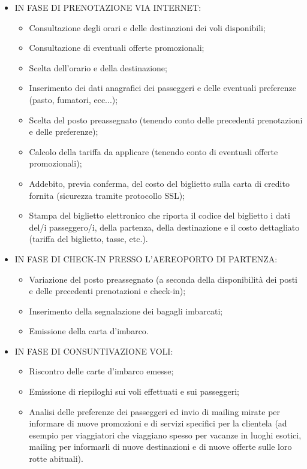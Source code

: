 \begin{itemize}

\item{IN FASE DI PRENOTAZIONE VIA INTERNET}:

\begin{itemize}

\item Consultazione degli orari e delle destinazioni dei voli disponibili;
\item Consultazione di eventuali offerte promozionali;
\item Scelta dell’orario e della destinazione;
\item Inserimento dei dati anagrafici dei passeggeri e delle eventuali preferenze (pasto, fumatori, ecc...);
\item Scelta del posto preassegnato (tenendo conto delle precedenti prenotazioni e delle preferenze);
\item Calcolo della tariffa da applicare (tenendo conto di eventuali offerte promozionali);
\item Addebito, previa conferma, del costo del biglietto sulla carta di credito fornita (sicurezza tramite protocollo SSL);
\item Stampa del biglietto elettronico che riporta il codice del biglietto i dati del/i passeggero/i, della partenza, della destinazione e il costo dettagliato (tariffa del biglietto, tasse, etc.).

\end{itemize}

\item{IN FASE DI CHECK-IN PRESSO L’AEREOPORTO DI PARTENZA}:

\begin{itemize}

\item Variazione del posto preassegnato (a seconda della disponibilità dei posti e delle precedenti prenotazioni e check-in);
\item Inserimento della segnalazione dei bagagli imbarcati;
\item Emissione della carta d’imbarco.

\end{itemize}

\item{IN FASE DI CONSUNTIVAZIONE VOLI}:

\begin{itemize}

\item Riscontro delle carte d’imbarco emesse;
\item Emissione di riepiloghi sui voli effettuati e sui passeggeri;
\item Analisi delle preferenze dei passeggeri ed invio di mailing mirate per informare di nuove promozioni e di servizi specifici per la clientela (ad esempio per viaggiatori che viaggiano spesso per vacanze in luoghi esotici, mailing per informarli di nuove destinazioni e di nuove offerte sulle loro rotte abituali).
\end{itemize}

\end{itemize}


